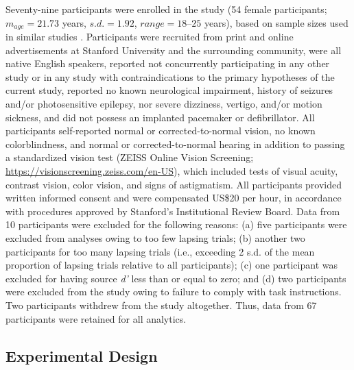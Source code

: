 Seventy-nine participants were enrolled in the study (54 female participants; $m_{age}=21.73$ years, $s.d.=1.92$, $range=18–25$ years), based on sample sizes used in similar studies \parencite{madore2020memory}. Participants were recruited from print and online advertisements at Stanford University and the surrounding community, were all native English speakers, reported not concurrently participating in any other study or in any study with contraindications to the primary hypotheses of the current study, reported no known neurological impairment, history of seizures and/or photosensitive epilepsy, nor severe dizziness, vertigo, and/or motion sickness, and did not possess an implanted pacemaker or defibrillator. All participants self-reported normal or corrected-to-normal vision, no known colorblindness, and normal or corrected-to-normal hearing in addition to passing a standardized vision test (ZEISS Online Vision Screening; \url{https://visionscreening.zeiss.com/en-US}), which included tests of visual acuity, contrast vision, color vision, and signs of astigmatism. All participants provided written informed consent and were compensated US\$20 per hour, in accordance with procedures approved by Stanford's Institutional Review Board. Data from 10 participants were excluded for the following reasons: (a) five participants were excluded from analyses owing to too few lapsing trials; (b) another two participants for too many lapsing trials (i.e., exceeding 2 s.d. of the mean proportion of lapsing trials relative to all participants); (c) one participant was excluded for having source \textit{d'} less than or equal to zero; and (d) two participants were excluded from the study owing to failure to comply with task instructions. Two participants withdrew from the study altogether. Thus, data from 67 participants were retained for all analytics.

\subsection{Experimental Design}

